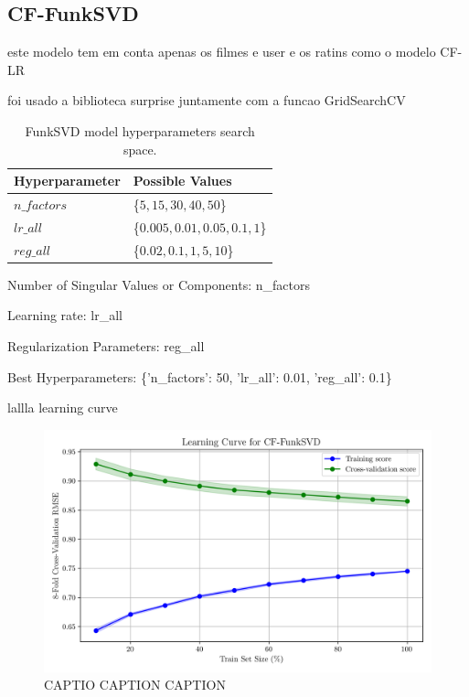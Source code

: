 \documentclass[conference]{IEEEtran}
\begin{document}
\subsection{CF-FunkSVD}

este modelo tem em conta apenas os filmes e user e os ratins como o modelo CF-LR

foi usado a biblioteca surprise juntamente com a funcao GridSearchCV

\begin{table}[H]
\centering
\caption{FunkSVD model hyperparameters search space.}
\label{parametrosSVD}
\begin{tabular}{ll}
\toprule
\textbf{Hyperparameter} & \textbf{Possible Values} \\
\midrule
$n\_factors$ & \{$5,15,30,40,50$\} \\ 
$lr\_all$ & \{$0.005, 0.01, 0.05, 0.1, 1$\} \\ 
$reg\_all$ & \{$0.02,0.1,1,5,10$\} \\ 
\bottomrule
\end{tabular}
\end{table}


Number of Singular Values or Components: n\_factors

Learning rate: lr\_all

Regularization Parameters: reg\_all

Best Hyperparameters: \{'n\_factors': 50, 'lr\_all': 0.01, 'reg\_all': 0.1\}

lallla learning curve

\begin{figure}[H]
    \centering
    \includegraphics[width=1\linewidth]{assets/model03_learningcurve.png}
    \caption{CAPTIO CAPTION CAPTION}
    \label{fig:model03_learningcurve}
\end{figure}
\end{document}

